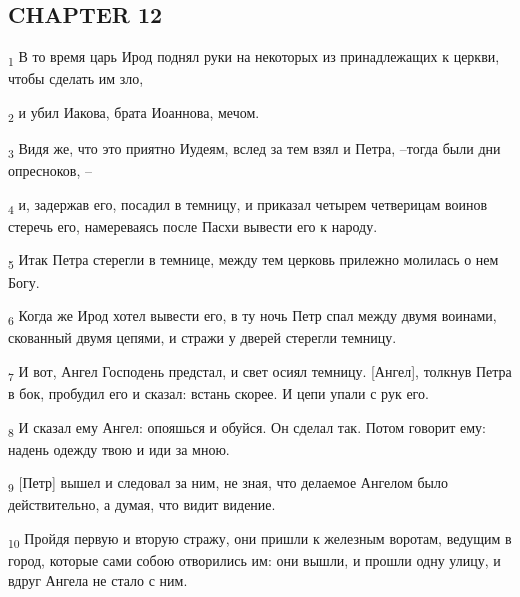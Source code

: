 \subsection{CHAPTER 12}
\begin{tcolorbox}
\textsubscript{1} В то время царь Ирод поднял руки на некоторых из принадлежащих к церкви, чтобы сделать им зло,
\end{tcolorbox}
\begin{tcolorbox}
\textsubscript{2} и убил Иакова, брата Иоаннова, мечом.
\end{tcolorbox}
\begin{tcolorbox}
\textsubscript{3} Видя же, что это приятно Иудеям, вслед за тем взял и Петра, --тогда были дни опресноков, --
\end{tcolorbox}
\begin{tcolorbox}
\textsubscript{4} и, задержав его, посадил в темницу, и приказал четырем четверицам воинов стеречь его, намереваясь после Пасхи вывести его к народу.
\end{tcolorbox}
\begin{tcolorbox}
\textsubscript{5} Итак Петра стерегли в темнице, между тем церковь прилежно молилась о нем Богу.
\end{tcolorbox}
\begin{tcolorbox}
\textsubscript{6} Когда же Ирод хотел вывести его, в ту ночь Петр спал между двумя воинами, скованный двумя цепями, и стражи у дверей стерегли темницу.
\end{tcolorbox}
\begin{tcolorbox}
\textsubscript{7} И вот, Ангел Господень предстал, и свет осиял темницу. [Ангел], толкнув Петра в бок, пробудил его и сказал: встань скорее. И цепи упали с рук его.
\end{tcolorbox}
\begin{tcolorbox}
\textsubscript{8} И сказал ему Ангел: опояшься и обуйся. Он сделал так. Потом говорит ему: надень одежду твою и иди за мною.
\end{tcolorbox}
\begin{tcolorbox}
\textsubscript{9} [Петр] вышел и следовал за ним, не зная, что делаемое Ангелом было действительно, а думая, что видит видение.
\end{tcolorbox}
\begin{tcolorbox}
\textsubscript{10} Пройдя первую и вторую стражу, они пришли к железным воротам, ведущим в город, которые сами собою отворились им: они вышли, и прошли одну улицу, и вдруг Ангела не стало с ним.
\end{tcolorbox}
